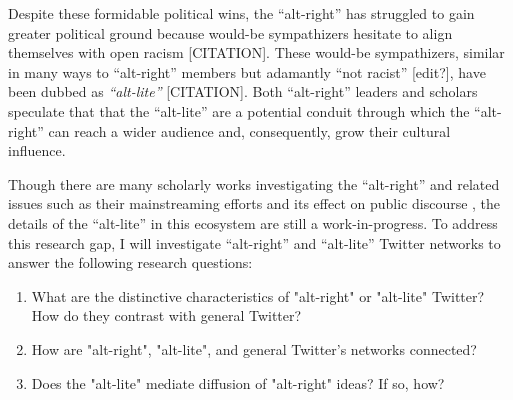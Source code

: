 \documentclass[acmlarge, screen, authorversion]{acmart}
\begin{document}
Despite these formidable political wins, the “alt-right” has
struggled to gain greater political ground because would-be sympathizers
hesitate to align themselves with open racism [CITATION]. These would-be
sympathizers, similar in many ways to “alt-right” members but adamantly
``not racist” [edit?], have been dubbed as \textit{``alt-lite”} [CITATION].
Both ``alt-right'' leaders and scholars speculate that that the ``alt-lite''
are a potential conduit through which the “alt-right” can reach a wider
audience and, consequently, grow their cultural influence.



Though there are many scholarly works investigating the
“alt-right” \cite{mainRiseAltRight2018, hawleyMakingSenseAltright2017, nagleKillAllNormies2017} and related issues such as their mainstreaming
efforts \cite{gallaherMainstreamingWhiteSupremacy2020} and its effect on public discourse \cite{sternProudBoysWhite2019, cammaertsMainstreamingExtremeRightWing2018}, the
details of the ``alt-lite” in this ecosystem are still a
work-in-progress. To address this research gap, I will investigate “alt-right” and “alt-lite” Twitter networks
to answer the following research questions:

\begin{enumerate}[font={\bfseries},label={{RQ}\arabic*.}]
    \item What are the distinctive characteristics of "alt-right" or "alt-lite" Twitter? How do they contrast with general Twitter?\label{}
    
    \item How are "alt-right", "alt-lite", and general Twitter's networks connected?\
    
    \item Does the "alt-lite" mediate diffusion of "alt-right" ideas? If so, how?
\end{enumerate}
\end{document}
